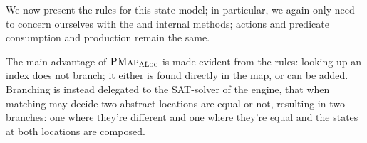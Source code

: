 We now present the rules for this state model; in particular, we again only need to concern ourselves with the  and  internal methods; actions and predicate consumption and production remain the same.

The main advantage of $\textsc{PMap}_{\textsc{ALoc}}$ is made evident from the rules: looking up an index does not branch; it either is found directly in the map, or can be added. Branching is instead delegated to the SAT-solver of the engine, that when matching may decide two abstract locations are equal or not, resulting in two branches: one where they're different and one where they're equal and the states at both locations are composed.






